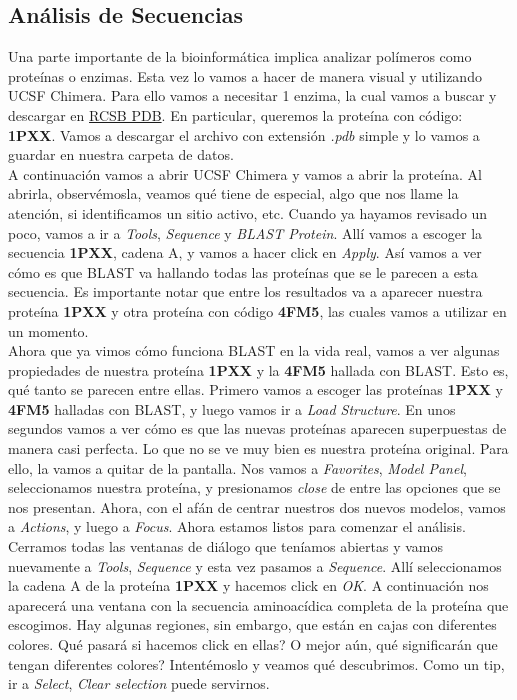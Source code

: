 \documentclass[10pt,letterpaper]{article}
\begin{document}
\subsection{An\'alisis de Secuencias}
Una parte importante de la bioinform\'atica implica analizar pol\'imeros como prote\'inas o enzimas. Esta vez lo vamos a hacer de manera visual y utilizando UCSF Chimera. Para ello vamos a necesitar 1 enzima, la cual vamos a buscar y descargar en \href{http://www.rcsb.org/pdb/home/home.do}{RCSB PDB}. En particular, queremos la prote\'ina con c\'odigo: \textbf{1PXX}. Vamos a descargar el archivo con extensi\'on \emph{.pdb} simple y lo vamos a guardar en nuestra carpeta de datos.\\

A continuaci\'on vamos a abrir UCSF Chimera y vamos a abrir la prote\'ina. Al abrirla, observ\'emosla, veamos qu\'e tiene de especial, algo que nos llame la atenci\'on, si identificamos un sitio activo, etc. Cuando ya hayamos revisado un poco, vamos a ir a \emph{Tools}, \emph{Sequence} y \emph{BLAST Protein}. All\'i vamos a escoger la secuencia \textbf{1PXX}, cadena A, y vamos a hacer click en \emph{Apply}. As\'i vamos a ver c\'omo es que BLAST va hallando todas las prote\'inas que se le parecen a esta secuencia. Es importante notar que entre los resultados va a aparecer nuestra prote\'ina \textbf{1PXX} y otra prote\'ina con c\'odigo \textbf{4FM5}, las cuales vamos a utilizar en un momento.\\

Ahora que ya vimos c\'omo funciona BLAST en la vida real, vamos a ver algunas propiedades de nuestra prote\'ina \textbf{1PXX} y la \textbf{4FM5} hallada con BLAST. Esto es, qu\'e tanto se parecen entre ellas. Primero vamos a escoger las prote\'inas \textbf{1PXX} y \textbf{4FM5} halladas con BLAST, y luego vamos ir a \emph{Load Structure}. En unos segundos vamos a ver c\'omo es que las nuevas prote\'inas aparecen superpuestas de manera casi perfecta. Lo que no se ve muy bien es nuestra prote\'ina original. Para ello, la vamos a quitar de la pantalla. Nos vamos a \emph{Favorites}, \emph{Model Panel}, seleccionamos nuestra prote\'ina, y presionamos \emph{close} de entre las opciones que se nos presentan. Ahora, con el af\'an de centrar nuestros dos nuevos modelos, vamos a \emph{Actions}, y luego a \emph{Focus}. Ahora estamos listos para comenzar el an\'alisis.\\

Cerramos todas las ventanas de di\'alogo que ten\'iamos abiertas y vamos nuevamente a \emph{Tools}, \emph{Sequence} y esta vez pasamos a \emph{Sequence}. All\'i seleccionamos la cadena A de la prote\'ina \textbf{1PXX} y hacemos click en \emph{OK}. A continuaci\'on nos aparecer\'a una ventana con la secuencia aminoac\'idica completa de la prote\'ina que escogimos. Hay algunas regiones, sin embargo, que est\'an en cajas con diferentes colores. Qu\'e pasar\'a si hacemos click en ellas? O mejor a\'un, qu\'e significar\'an que tengan diferentes colores? Intent\'emoslo y veamos qu\'e descubrimos. Como un tip, ir a \emph{Select}, \emph{Clear selection} puede servirnos.\\
\end{document}
